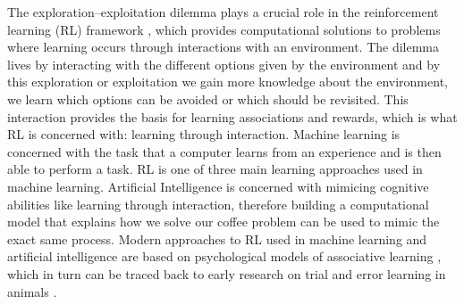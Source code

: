 The exploration--exploitation dilemma plays a crucial role in the reinforcement learning (RL) framework \citep{sutton2018reinforcement}, which provides computational solutions to problems where learning occurs through interactions with an environment.
The dilemma lives by interacting with the different options given by the environment and by this exploration or exploitation we gain more knowledge about the environment, we learn which options can be avoided or which should be revisited. %
This interaction provides the basis for learning associations and rewards, which is what RL is concerned with: learning through interaction. 
Machine learning is concerned with the task that a computer learns from an experience and is then able to perform a task. %
RL is one of three main learning approaches used in machine learning. 
Artificial Intelligence is concerned with mimicing cognitive abilities like learning through interaction, therefore building a computational model that explains how we solve our coffee problem can be used to mimic the exact same process. %
Modern approaches to RL used in machine learning \citep{sutton2018reinforcement} and artificial intelligence \citep{sutton2018reinforcement, russell2016artificial} are based on psychological models of associative learning \citep{bush1951model,rescorla1972theory,dayan2000learning,sutton2018reinforcement}, which in turn can be traced back to early research on trial and error learning in animals \citep{thorndike1927law, skinner1963operant}.


